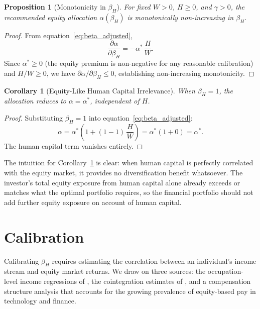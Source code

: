 \documentclass[11pt]{article}
\newtheorem{proposition}{Proposition}
\newtheorem{corollary}{Corollary}
\begin{document}
\begin{proposition}[Monotonicity in $\beta_H$]\label{prop:mono}
For fixed $W > 0$, $H \geq 0$, and $\gamma > 0$, the recommended equity
allocation $\alpha(\beta_H)$ is monotonically non-increasing in $\beta_H$.
\end{proposition}

\begin{proof}
From equation~\eqref{eq:beta_adjusted},
\begin{equation}
  \frac{\partial \alpha}{\partial \beta_H}
  = -\alpha^{*}\,\frac{H}{W}.
\end{equation}
Since $\alpha^{*} \geq 0$ (the equity premium is non-negative for any
reasonable calibration) and $H/W \geq 0$, we have
$\partial\alpha / \partial\beta_H \leq 0$, establishing
non-increasing monotonicity.
\end{proof}

\begin{corollary}[Equity-Like Human Capital Irrelevance]\label{cor:beta1}
When $\beta_H = 1$, the allocation reduces to
$\alpha = \alpha^{*}$, independent of $H$.
\end{corollary}

\begin{proof}
Substituting $\beta_H = 1$ into equation~\eqref{eq:beta_adjusted}:
\begin{equation}
  \alpha = \alpha^{*}\!\left(1 + (1-1)\,\frac{H}{W}\right)
         = \alpha^{*}\!\left(1 + 0\right)
         = \alpha^{*}.
\end{equation}
The human capital term vanishes entirely.
\end{proof}

The intuition for Corollary~\ref{cor:beta1} is clear: when human capital
is perfectly correlated with the equity market, it provides no
diversification benefit whatsoever. The investor's total equity exposure
from human capital alone already exceeds or matches what the optimal
portfolio requires, so the financial portfolio should not add further
equity exposure on account of human capital.


\section{Calibration}\label{sec:calibration}

Calibrating $\beta_H$ requires estimating the correlation between an
individual's income stream and equity market returns. We draw on three
sources: the occupation-level income regressions of \citet{davis2000}, the
cointegration estimates of \citet{benzoni2007}, and a compensation
structure analysis that accounts for the growing prevalence of equity-based
pay in technology and finance.
\end{document}
